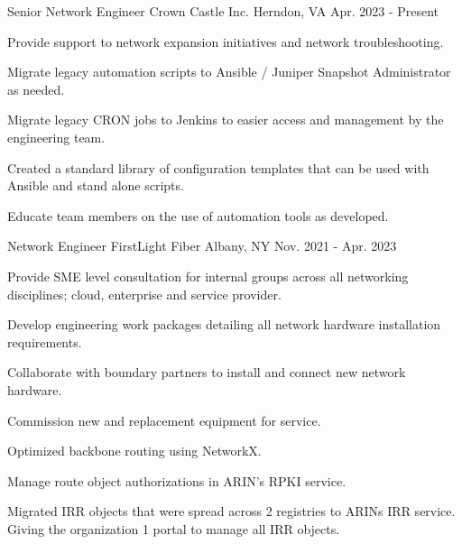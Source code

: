 

\begin{cventries}

  \cventry
    {Senior Network Engineer} %
    {Crown Castle Inc.} %
    {Herndon, VA} %
    {Apr. 2023 - Present} %
    {
      \begin{cvitems} %
        \item {Provide support to network expansion initiatives and network troubleshooting.}
        \item {Migrate legacy automation scripts to Ansible / Juniper Snapshot Administrator as needed.}
        \item {Migrate legacy CRON jobs to Jenkins to easier access and management by the engineering team.}
        \item {Created a standard library of configuration templates that can be used with Ansible and stand alone scripts.}
        \item {Educate team members on the use of automation tools as developed.}
      \end{cvitems}
    }

  \cventry
    {Network Engineer} %
    {FirstLight Fiber} %
    {Albany, NY} %
    {Nov. 2021 - Apr. 2023} %
    {
      \begin{cvitems}
        \item {Provide SME level consultation for internal groups across all networking disciplines; cloud, enterprise and service provider.}
        \item {Develop engineering work packages detailing all network hardware installation requirements.}
        \item {Collaborate with boundary partners to install and connect new network hardware.}
        \item {Commission new and replacement equipment for service.}
        \item {Optimized backbone routing using NetworkX.}
        \item {Manage route object authorizations in ARIN's RPKI service.}
        \item {Migrated IRR objects that were spread across 2 registries to ARINs IRR service. Giving the organization 1 portal to manage all IRR objects.}
      \end{cvitems}
    }


\end{cventries}
